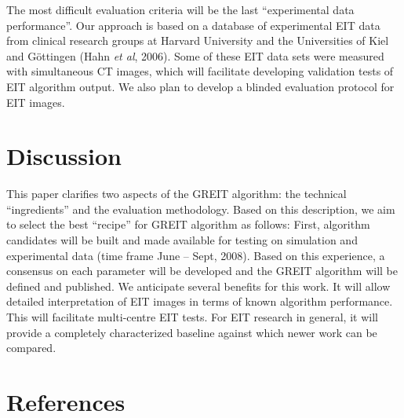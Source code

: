 \documentclass[letterpaper,twocolumn,10pt]{article}
\newcommand{\etal}{{\em et al}}
\begin{document}
The most difficult evaluation criteria will be the 
last ``experimental data performance''. Our approach
is based on a database of experimental
EIT data from clinical research groups at Harvard University
and the Universities
of Kiel and G\"ottingen (Hahn \etal, 
2006). Some of these EIT data sets were measured with
simultaneous CT images, which will facilitate developing
validation tests of EIT algorithm output. We also
plan to develop a blinded evaluation protocol for
EIT images.


\section{Discussion}

This paper clarifies two aspects of the
GREIT algorithm: the technical ``ingredients''
and the evaluation methodology. Based on
this description, we aim to select the best
``recipe'' for GREIT algorithm as follows:
First, algorithm candidates will be
built and made available for testing on
simulation and experimental data
(time frame June -- Sept, 2008). 
Based on this experience, a consensus
on each parameter will be developed
and the GREIT algorithm will be
defined and published.
We anticipate several benefits for
this work. It will allow detailed
interpretation of EIT images in terms of
known algorithm performance. This will facilitate
multi-centre EIT tests. For EIT research in
general, it will provide a completely characterized
baseline against which newer work can be compared.



\section*{References}
\end{document}
